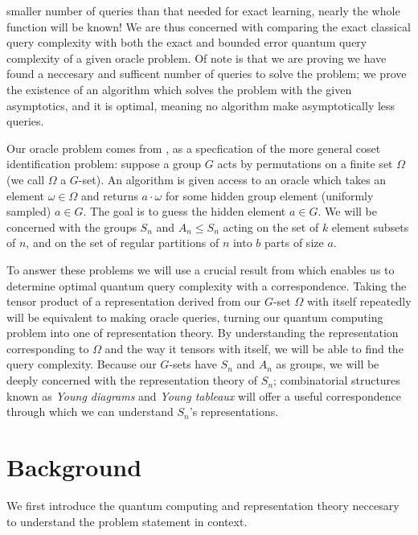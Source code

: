 \documentclass[12pt,twoside]{reedthesis}
\theoremstyle{plain}   %
\theoremstyle{definition}
\theoremstyle{remark}
\numberwithin{equation}{section}
\begin{document}
  smaller number of queries than that needed for exact learning, nearly the whole function will be known!
  We are thus concerned with comparing the exact classical query complexity with both the exact and bounded error quantum query complexity of a given oracle problem.
  Of note is that we are proving we have found a neccesary and sufficent number of queries to solve the problem; we prove the existence of an algorithm which solves the problem with the given asymptotics, and it is optimal,
  meaning no algorithm make asymptotically less queries.
  \par
  Our oracle problem comes from \cite{copeland}, as a specfication of the more general coset identification problem:
  suppose a group $G$ acts by permutations on a finite set $\Omega$ (we call $\Omega$ a $G$-set).
  An algorithm is given access to an oracle which takes an element $\omega \in \Omega$ and returns $a \cdot \omega$ for some hidden group element (uniformly sampled) $a \in G$. The goal is to guess
  the hidden element $a \in G$.
  We will be concerned with the groups $S_n$ and $A_n \leq S_n$ acting on the set of $k$ element subsets of $n$, and on the set of regular partitions of $n$ into $b$ parts of size $a$.
  \par
  To answer these problems we will use a crucial result from \cite{copeland} which enables us to determine optimal quantum query complexity with a correspondence.
  Taking the tensor product of a representation derived from our $G$-set $\Omega$ with itself repeatedly will be equivalent to making oracle queries, turning our quantum computing problem
  into one of representation theory.
  By understanding the representation corresponding to $\Omega$ and the way it tensors with itself, we will be able to find the query complexity.
  Because our $G$-sets have $S_n$ and $A_n$ as groups, we will be deeply concerned with the representation theory of $S_n$;
  combinatorial structures known as \emph{Young diagrams} and \emph{Young tableaux} will offer a useful correspondence through which we can understand $S_n$'s representations.
  
  
  \chapter{Background}
  We first introduce the quantum computing and representation theory neccesary to understand the problem statement in context.
\end{document}
